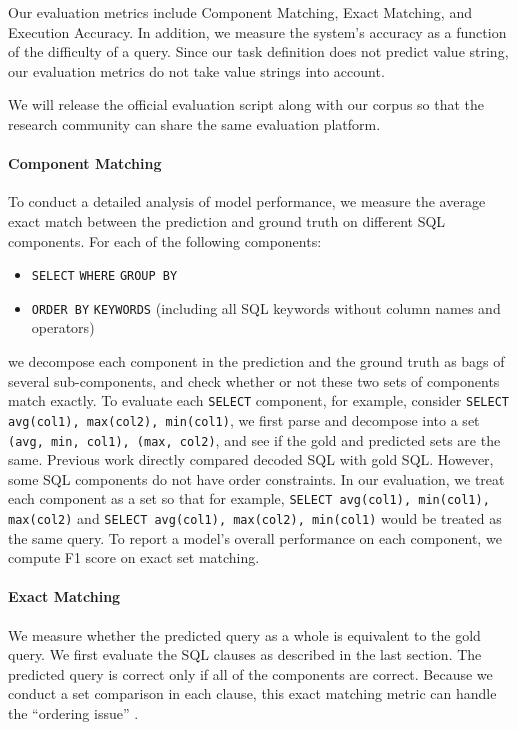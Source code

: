 \documentclass[11pt,a4paper]{article}
\begin{document}
Our evaluation metrics include Component Matching, Exact Matching, and Execution Accuracy.
In addition, we measure the system's accuracy as a function of the difficulty of a query.
Since our task definition does not predict value string, our evaluation metrics do not take value strings into account.

We will release the official evaluation script along with our corpus so that the research community can share the same evaluation platform.

\paragraph{Component Matching} 
To conduct a detailed analysis of model performance, we measure the average exact match between the prediction and ground truth on different SQL components. For each of the following components: \vspace{-2mm}
\begin{itemize}
    \setlength{\itemsep}{-1mm}
    \item \texttt{SELECT} \quad  \texttt{WHERE} \quad  \texttt{GROUP BY}
    \item  \texttt{ORDER BY} \quad  \texttt{KEYWORDS} (including all SQL keywords without column names and operators)
\end{itemize}\vspace{-2mm}
we decompose each component in the prediction and the ground truth as bags of several sub-components, and check whether or not these two sets of components match exactly.
To evaluate each \texttt{SELECT} component, for example, consider \texttt{SELECT avg(col1), max(col2), min(col1)},  we first parse and decompose into a set \texttt{(avg, min, col1), (max, col2)}, and see if the gold and predicted sets are the same.
Previous work directly compared decoded SQL with gold SQL. 
However, some SQL components do not have order constraints.
In our evaluation, we treat each component as a set so that for example, \texttt{SELECT avg(col1),  min(col1), max(col2)} and \texttt{SELECT avg(col1), max(col2), min(col1)} would be treated as the same query.
To report a model's overall performance on each component, we compute F1 score on exact set matching.


\paragraph{Exact Matching} 
We measure whether the predicted query as a whole is equivalent to the gold query.
We first evaluate the SQL clauses as described in the last section. The predicted query is correct only if all of the components are correct. Because we conduct a set comparison in each clause, this exact matching metric can handle the ``ordering issue'' \cite{Xu2017}.
\end{document}
